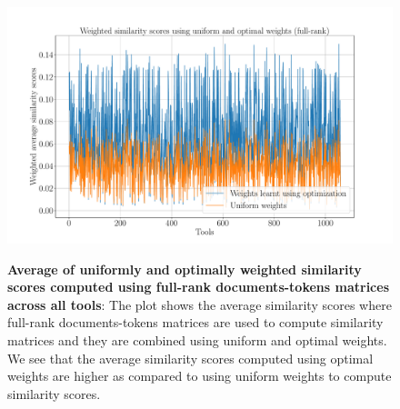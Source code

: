 \begin{figure}[h]
\begin{centering}
    {\includegraphics[scale=0.37]{figures/Optimization_100_lsi.pdf}}
    \caption[Average of uniformly and optimally weighted similarity scores computed using full-rank documents-tokens matrices across all tools]{\textbf{Average of uniformly and optimally weighted similarity scores computed using full-rank documents-tokens matrices across all tools}: The plot shows the average similarity scores where full-rank documents-tokens matrices are used to compute similarity matrices and they are combined using uniform and optimal weights. We see that the average similarity scores computed using optimal weights are higher as compared to using uniform weights to compute similarity scores. }
\end{centering}
\end{figure}


